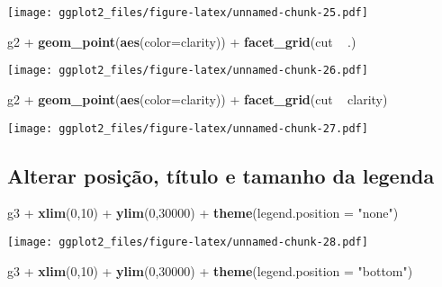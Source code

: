 \documentclass[]{article}
\newenvironment{Shaded}{\begin{snugshade}}{\end{snugshade}}
\newcommand{\KeywordTok}[1]{\textcolor[rgb]{0.13,0.29,0.53}{\textbf{{#1}}}}
\newcommand{\DataTypeTok}[1]{\textcolor[rgb]{0.13,0.29,0.53}{{#1}}}
\newcommand{\DecValTok}[1]{\textcolor[rgb]{0.00,0.00,0.81}{{#1}}}
\newcommand{\StringTok}[1]{\textcolor[rgb]{0.31,0.60,0.02}{{#1}}}
\newcommand{\NormalTok}[1]{{#1}}
\begin{document}
\texttt{[image: ggplot2\_files/figure-latex/unnamed-chunk-25.pdf]}

\newpage

\begin{Shaded}
\begin{Highlighting}[]
\NormalTok{g2 +}\StringTok{ }\KeywordTok{geom_point}\NormalTok{(}\KeywordTok{aes}\NormalTok{(}\DataTypeTok{color=}\NormalTok{clarity)) +}\StringTok{ }\KeywordTok{facet_grid}\NormalTok{(cut ~}\StringTok{ }\NormalTok{.)}
\end{Highlighting}
\end{Shaded}

\texttt{[image: ggplot2\_files/figure-latex/unnamed-chunk-26.pdf]}

\newpage

\begin{Shaded}
\begin{Highlighting}[]
\NormalTok{g2 +}\StringTok{ }\KeywordTok{geom_point}\NormalTok{(}\KeywordTok{aes}\NormalTok{(}\DataTypeTok{color=}\NormalTok{clarity)) +}\StringTok{ }\KeywordTok{facet_grid}\NormalTok{(cut ~}\StringTok{ }\NormalTok{clarity)}
\end{Highlighting}
\end{Shaded}

\texttt{[image: ggplot2\_files/figure-latex/unnamed-chunk-27.pdf]}

\newpage

\subsection{Alterar posição, título e tamanho da
legenda}\label{alterar-posicao-titulo-e-tamanho-da-legenda}

\begin{Shaded}
\begin{Highlighting}[]
\NormalTok{g3 +}\StringTok{ }\KeywordTok{xlim}\NormalTok{(}\DecValTok{0}\NormalTok{,}\DecValTok{10}\NormalTok{) +}\StringTok{ }\KeywordTok{ylim}\NormalTok{(}\DecValTok{0}\NormalTok{,}\DecValTok{30000}\NormalTok{) +}\StringTok{ }\KeywordTok{theme}\NormalTok{(}\DataTypeTok{legend.position =} \StringTok{"none"}\NormalTok{)}
\end{Highlighting}
\end{Shaded}

\texttt{[image: ggplot2\_files/figure-latex/unnamed-chunk-28.pdf]}

\newpage

\begin{Shaded}
\begin{Highlighting}[]
\NormalTok{g3 +}\StringTok{ }\KeywordTok{xlim}\NormalTok{(}\DecValTok{0}\NormalTok{,}\DecValTok{10}\NormalTok{) +}\StringTok{ }\KeywordTok{ylim}\NormalTok{(}\DecValTok{0}\NormalTok{,}\DecValTok{30000}\NormalTok{) +}\StringTok{ }\KeywordTok{theme}\NormalTok{(}\DataTypeTok{legend.position =} \StringTok{"bottom"}\NormalTok{)}
\end{Highlighting}
\end{Shaded}
\end{document}
